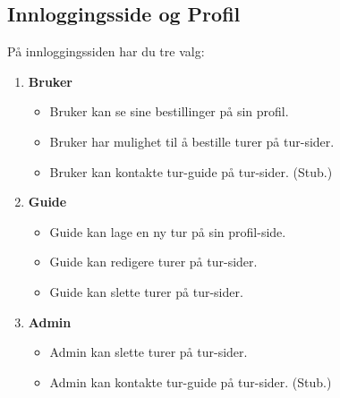 \documentclass[../doc]{subfiles}
\begin{document}
\subsection{Innloggingsside og Profil}
På innloggingssiden har du tre valg:
\begin{enumerate}
    \item \textbf{Bruker}
    \begin{itemize}
        \item Bruker kan se sine bestillinger på sin profil.
        \item Bruker har mulighet til å bestille turer på tur-sider.
        \item Bruker kan kontakte tur-guide på tur-sider. (Stub.)
    \end{itemize}
    \item \textbf{Guide}
    \begin{itemize}
        \item Guide kan lage en ny tur på sin profil-side.
        \item Guide kan redigere turer på tur-sider.
        \item Guide kan slette turer på tur-sider.
    \end{itemize}
    \item \textbf{Admin}
    \begin{itemize}
        \item Admin kan slette turer på tur-sider.
        \item Admin kan kontakte tur-guide på tur-sider. (Stub.)
    \end{itemize}
\end{enumerate}
\end{document}

